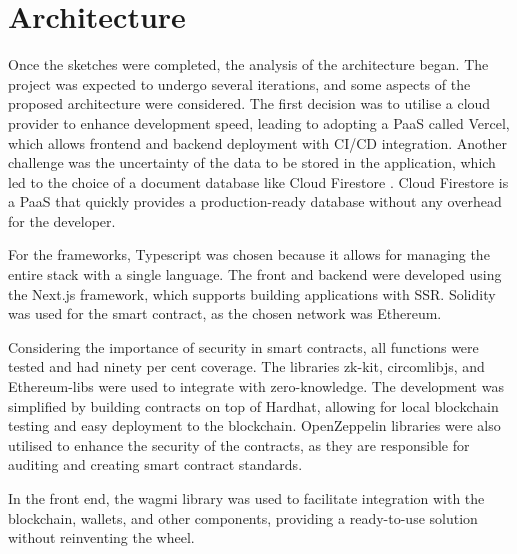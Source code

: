 \section{Architecture}
Once the sketches were completed, the analysis of the architecture began. The project was expected to undergo several iterations, and some aspects of the proposed architecture were considered. The first decision was to utilise a cloud provider to enhance development speed, leading to adopting a \ac{PaaS} called Vercel, which allows frontend and backend deployment with \ac{CI/CD} integration. Another challenge was the uncertainty of the data to be stored in the application, which led to the choice of a document database like Cloud Firestore \cite{google2020cloud_firestore}. Cloud Firestore is a \ac{PaaS} that quickly provides a production-ready database without any overhead for the developer.

For the frameworks, Typescript was chosen because it allows for managing the entire stack with a single language. The front and backend were developed using the Next.js framework, which supports building applications with \ac{SSR}. Solidity was used for the smart contract, as the chosen network was Ethereum.

Considering the importance of security in smart contracts, all functions were tested and had ninety per cent coverage. The libraries zk-kit, circomlibjs, and Ethereum-libs were used to integrate with zero-knowledge. The development was simplified by building contracts on top of Hardhat, allowing for local blockchain testing and easy deployment to the blockchain. OpenZeppelin libraries were also utilised to enhance the security of the contracts, as they are responsible for auditing and creating smart contract standards.

In the front end, the wagmi library was used to facilitate integration with the blockchain, wallets, and other components, providing a ready-to-use solution without reinventing the wheel.


